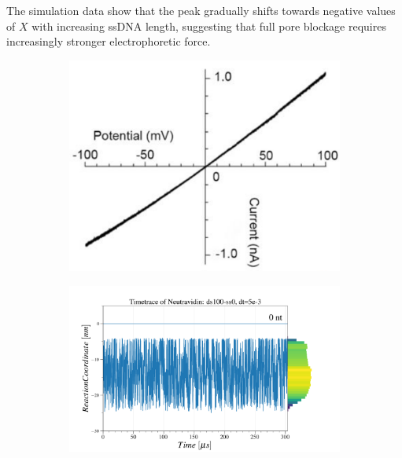 The simulation data show that the peak gradually shifts towards negative values of $X$
with increasing ssDNA length, suggesting that full pore blockage requires increasingly
stronger electrophoretic force.








\begin{figure}[ht]

  \begin{centering}
  \begin{subfigure}[t]{\dimexpr.29\linewidth-1.3em\relax}
  \centering
  \vspace{0.6cm}
  \includegraphics[width=1\linewidth,valign=t]{Figures/IV-100.png}
  \end{subfigure}%
  \begin{subfigure}[t]{\dimexpr.5\linewidth-1.3em\relax}
  \centering
  \vspace{-0.1cm}
  \includegraphics[width=\linewidth,valign=t]{Figures/MR-100.png}

\end{subfigure}
\end{centering}
\end{figure}
